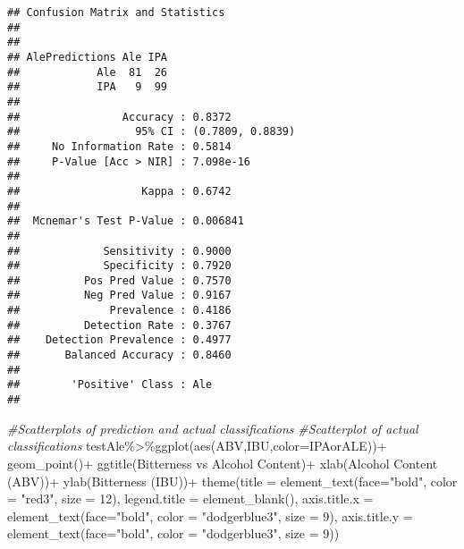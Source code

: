 \documentclass[
]{article}
\newenvironment{Shaded}{\begin{snugshade}}{\end{snugshade}}
\newcommand{\AttributeTok}[1]{\textcolor[rgb]{0.77,0.63,0.00}{#1}}
\newcommand{\CommentTok}[1]{\textcolor[rgb]{0.56,0.35,0.01}{\textit{#1}}}
\newcommand{\DecValTok}[1]{\textcolor[rgb]{0.00,0.00,0.81}{#1}}
\newcommand{\FunctionTok}[1]{\textcolor[rgb]{0.00,0.00,0.00}{#1}}
\newcommand{\NormalTok}[1]{#1}
\newcommand{\SpecialCharTok}[1]{\textcolor[rgb]{0.00,0.00,0.00}{#1}}
\newcommand{\StringTok}[1]{\textcolor[rgb]{0.31,0.60,0.02}{#1}}
\begin{document}
\begin{verbatim}
## Confusion Matrix and Statistics
## 
##               
## AlePredictions Ale IPA
##            Ale  81  26
##            IPA   9  99
##                                           
##                Accuracy : 0.8372          
##                  95% CI : (0.7809, 0.8839)
##     No Information Rate : 0.5814          
##     P-Value [Acc > NIR] : 7.098e-16       
##                                           
##                   Kappa : 0.6742          
##                                           
##  Mcnemar's Test P-Value : 0.006841        
##                                           
##             Sensitivity : 0.9000          
##             Specificity : 0.7920          
##          Pos Pred Value : 0.7570          
##          Neg Pred Value : 0.9167          
##              Prevalence : 0.4186          
##          Detection Rate : 0.3767          
##    Detection Prevalence : 0.4977          
##       Balanced Accuracy : 0.8460          
##                                           
##        'Positive' Class : Ale             
## 
\end{verbatim}

\begin{Shaded}
\begin{Highlighting}[]
\CommentTok{\#Scatterplots of prediction and actual classifications}
\CommentTok{\#Scatterplot of actual classifications}
\NormalTok{testAle}\SpecialCharTok{\%\textgreater{}\%}\FunctionTok{ggplot}\NormalTok{(}\FunctionTok{aes}\NormalTok{(ABV,IBU,}\AttributeTok{color=}\NormalTok{IPAorALE))}\SpecialCharTok{+}
  \FunctionTok{geom\_point}\NormalTok{()}\SpecialCharTok{+}
  \FunctionTok{ggtitle}\NormalTok{(}\StringTok{\textquotesingle{}Bitterness vs Alcohol Content\textquotesingle{}}\NormalTok{)}\SpecialCharTok{+}
  \FunctionTok{xlab}\NormalTok{(}\StringTok{\textquotesingle{}Alcohol Content (ABV)\textquotesingle{}}\NormalTok{)}\SpecialCharTok{+}
  \FunctionTok{ylab}\NormalTok{(}\StringTok{\textquotesingle{}Bitterness (IBU)\textquotesingle{}}\NormalTok{)}\SpecialCharTok{+}
  \FunctionTok{theme}\NormalTok{(}\AttributeTok{title =} \FunctionTok{element\_text}\NormalTok{(}\AttributeTok{face=}\StringTok{"bold"}\NormalTok{, }\AttributeTok{color =} \StringTok{"red3"}\NormalTok{, }\AttributeTok{size =} \DecValTok{12}\NormalTok{),}
        \AttributeTok{legend.title =} \FunctionTok{element\_blank}\NormalTok{(),}
        \AttributeTok{axis.title.x =} \FunctionTok{element\_text}\NormalTok{(}\AttributeTok{face=}\StringTok{"bold"}\NormalTok{, }\AttributeTok{color =} \StringTok{"dodgerblue3"}\NormalTok{, }\AttributeTok{size =} \DecValTok{9}\NormalTok{),}
        \AttributeTok{axis.title.y =} \FunctionTok{element\_text}\NormalTok{(}\AttributeTok{face=}\StringTok{"bold"}\NormalTok{, }\AttributeTok{color =} \StringTok{"dodgerblue3"}\NormalTok{, }\AttributeTok{size =} \DecValTok{9}\NormalTok{))}
\end{Highlighting}
\end{Shaded}
\end{document}
